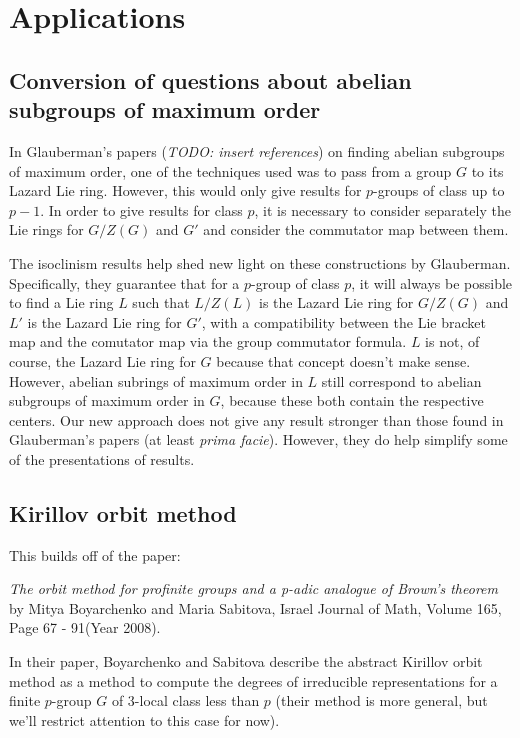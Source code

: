 \newpage
\section{Applications}

\subsection{Conversion of questions about abelian subgroups of maximum order}

In Glauberman's papers ({\em TODO: insert references}) on finding
abelian subgroups of maximum order, one of the techniques used was to
pass from a group $G$ to its Lazard Lie ring. However, this would only
give results for $p$-groups of class up to $p - 1$. In order to give
results for class $p$, it is necessary to consider separately the Lie
rings for $G/Z(G)$ and $G'$ and consider the commutator map between
them.

The isoclinism results help shed new light on these constructions by
Glauberman. Specifically, they guarantee that for a $p$-group of class
$p$, it will always be possible to find a Lie ring $L$ such that
$L/Z(L)$ is the Lazard Lie ring for $G/Z(G)$ and $L'$ is the Lazard
Lie ring for $G'$, with a compatibility between the Lie bracket map
and the comutator map via the group commutator formula. $L$ is not, of
course, the Lazard Lie ring for $G$ because that concept doesn't make
sense. However, abelian subrings of maximum order in $L$ still
correspond to abelian subgroups of maximum order in $G$, because these
both contain the respective centers. Our new approach does not give
any result stronger than those found in Glauberman's papers (at least
{\em prima facie}). However, they do help simplify some of the
presentations of results.

\subsection{Kirillov orbit method}

This builds off of the paper:

{\em The orbit method for profinite groups and a p-adic analogue of
Brown's theorem} by Mitya Boyarchenko and Maria Sabitova, Israel
Journal of Math, Volume 165, Page 67 - 91(Year 2008).

In their paper, Boyarchenko and Sabitova describe the abstract
Kirillov orbit method as a method to compute the degrees of
irreducible representations for a finite $p$-group $G$ of $3$-local
class less than $p$ (their method is more general, but we'll restrict
attention to this case for now).

